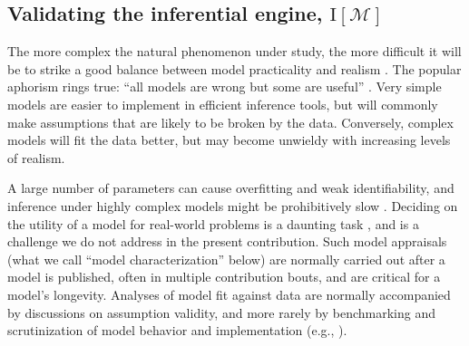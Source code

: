 \documentclass[oneside]{article}
\begin{document}
\subsection*{Validating the inferential engine, $\text{I}[\mathcal{M}]$}
\label{sec:sbc}

The more complex the natural phenomenon under study, the more difficult it will be to strike a good balance between model practicality and realism \citep{levins1966}.
The popular aphorism rings true: ``all models are wrong but some are useful'' \citep{box79}.
Very simple models are easier to implement in efficient inference tools, but will commonly make assumptions that are likely to be broken by the data. 
Conversely, complex models will fit the data better, but may become unwieldy with increasing levels of realism.

A large number of parameters can cause overfitting and weak identifiability, and inference under highly complex models might be prohibitively slow \citep{shapiro2000}.
Deciding on the utility of a model for real-world problems is a daunting task \citep{brown18,shepherd18}, and is a challenge we do not address in the present contribution.
Such model appraisals (what we call ``model characterization'' below) are normally carried out after a model is published, often in multiple  contribution bouts, and are critical for a model's longevity.
Analyses of model fit against data are normally accompanied by discussions on assumption validity, and more rarely by benchmarking and scrutinization of model behavior and implementation (e.g., \citealp{maddison07,stadler10,rabosky13,rabosky15,moore16}).
\end{document}
